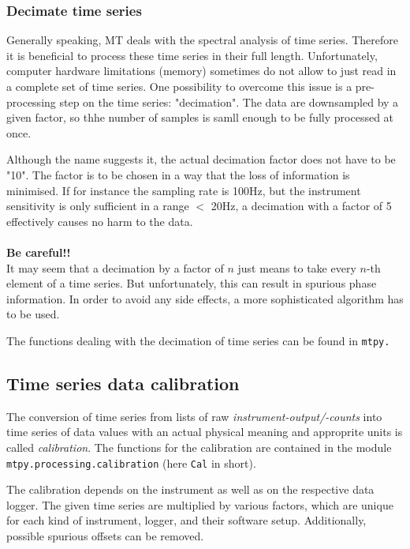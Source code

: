 \subsubsection{Decimate time series}

Generally speaking, MT deals with the spectral analysis of time series. Therefore it is beneficial to process these time series in their full length. Unfortunately, computer hardware limitations (memory) sometimes do not allow to just read in a complete set of time series. 
One possibility to overcome this issue is a pre-processing step on the time series: "decimation". The data are downsampled by a given factor, so thhe number of samples is samll enough to be fully processed at once. 

Although the name suggests it, the actual decimation factor does not have to be "10". The factor is to be chosen in a way that the loss of information is minimised. If for instance the sampling rate is 100Hz, but the instrument sensitivity is only sufficient in a range $<$ 20Hz, a decimation with a factor of 5 effectively causes no harm to the data.\\
{~}\\
\textbf{Be careful!!}\\
It may seem that a decimation by a factor of $n$ just means to take every $n$-th element of a time series. But unfortunately, this can result in spurious phase information. In order to avoid any side effects, a more sophisticated algorithm has to be used.

The functions dealing with the decimation of time series can be found in \texttt{mtpy.}  




\subsection{Time series data calibration}

The conversion of  time series from lists of raw \textit{instrument-output/-counts} into time series of data values with an actual physical meaning and approprite units is called \textit{calibration}. The functions for the calibration are contained in the module \texttt{mtpy.processing.calibration} (here \texttt{Cal} in short).

The calibration depends on  the instrument as well as on the respective data logger. The given time series are multiplied by various factors, which are unique for each kind of instrument,  logger, and their software setup. Additionally, possible spurious offsets can be removed.

